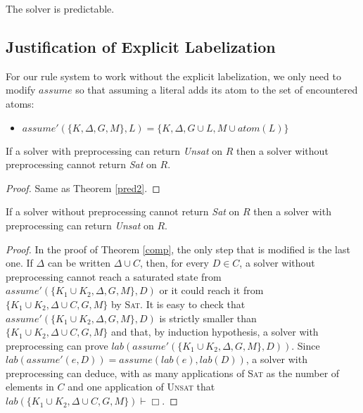 \documentclass[a4paper,11pt]{article}
\newcommand{\atom}{\mathit{atom}}
\newcommand{\T}{\mathit{lab}}
\newcommand{\A}{\mathit{assume}}
\begin{document}
{\corollary The solver is predictable.}

\subsection{Justification of Explicit Labelization}
For our rule system to work without the explicit labelization, we only need to modify $\A$ so that
assuming a literal adds its atom to the set of encountered atoms:
\begin{itemize}
 \item $\A'(\{K,\Delta,G,M\},L)=\{K,\Delta,G\cup L,M\cup\atom(L)\}$
\end{itemize}

{\theorem If a solver with preprocessing can return \emph{Unsat} on $R$ then
a solver without preprocessing cannot return \emph{Sat} on $R$.}
\begin{proof}
Same as Theorem \ref{pred2}.
\end{proof}

{\theorem If a solver without preprocessing cannot return \emph{Sat} on $R$ then
a solver with preprocessing can return \emph{Unsat} on $R$.}
\begin{proof}
In the proof of Theorem \ref{comp}, the only step that is modified is the last one.
If $\Delta$ can be written $\Delta\cup C$, then, for every $D\in C$, a solver without preprocessing
cannot reach a saturated state from $\A'(\{K_1\cup K_2,\Delta,G,M\},D)$ or it could
reach it from $\{K_1\cup K_2,\Delta\cup C,G,M\}$ by \textsc{Sat}.
It is easy to check that 
$\A'(\{K_1\cup K_2,\Delta,G,M\},D)$ is strictly smaller than $\{K_1\cup K_2,\Delta\cup C,G,M\}$
and that, by induction hypothesis, a solver with preprocessing can prove
$\T(\A'(\{K_1\cup K_2,\Delta,G,M\},D))$. Since
$\T(\A'(e,D))=\A(\T(e),\T(D))$,
a solver with preprocessing can deduce, with as many applications of \textsc{Sat} as the number
of elements in $C$ and one application of \textsc{Unsat} that
$\T(\{K_1\cup K_2,\Delta\cup C,G,M\})\vdash\Box$.
\end{proof}
\end{document}
